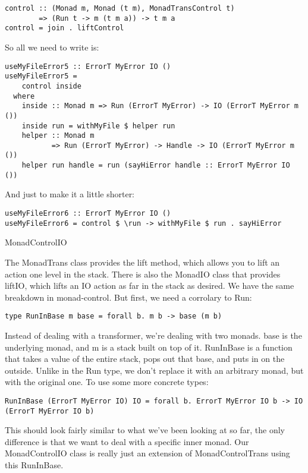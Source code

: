 \begin{lstlisting}
control :: (Monad m, Monad (t m), MonadTransControl t)
        => (Run t -> m (t m a)) -> t m a
control = join . liftControl
\end{lstlisting}

So all we need to write is:

\begin{lstlisting}
useMyFileError5 :: ErrorT MyError IO ()
useMyFileError5 =
    control inside
  where
    inside :: Monad m => Run (ErrorT MyError) -> IO (ErrorT MyError m ())
    inside run = withMyFile $ helper run
    helper :: Monad m
           => Run (ErrorT MyError) -> Handle -> IO (ErrorT MyError m ())
    helper run handle = run (sayHiError handle :: ErrorT MyError IO ())
\end{lstlisting}

And just to make it a little shorter:

\begin{lstlisting}
useMyFileError6 :: ErrorT MyError IO ()
useMyFileError6 = control $ \run -> withMyFile $ run . sayHiError
\end{lstlisting}

MonadControlIO

The MonadTrans class provides the lift method, which allows you to lift an action one level in the stack. There is also the MonadIO class that provides liftIO, which lifts an IO action as far in the stack as desired. We have the same breakdown in monad-control. But first, we need a corrolary to Run:

\begin{lstlisting}
type RunInBase m base = forall b. m b -> base (m b)
\end{lstlisting}

Instead of dealing with a transformer, we're dealing with two monads. base is the underlying monad, and m is a stack built on top of it. RunInBase is a function that takes a value of the entire stack, pops out that base, and puts in on the outside. Unlike in the Run type, we don't replace it with an arbitrary monad, but with the original one. To use some more concrete types:

\begin{lstlisting}
RunInBase (ErrorT MyError IO) IO = forall b. ErrorT MyError IO b -> IO (ErrorT MyError IO b)
\end{lstlisting}

This should look fairly similar to what we've been looking at so far, the only difference is that we want to deal with a specific inner monad. Our MonadControlIO class is really just an extension of MonadControlTrans using this RunInBase.

